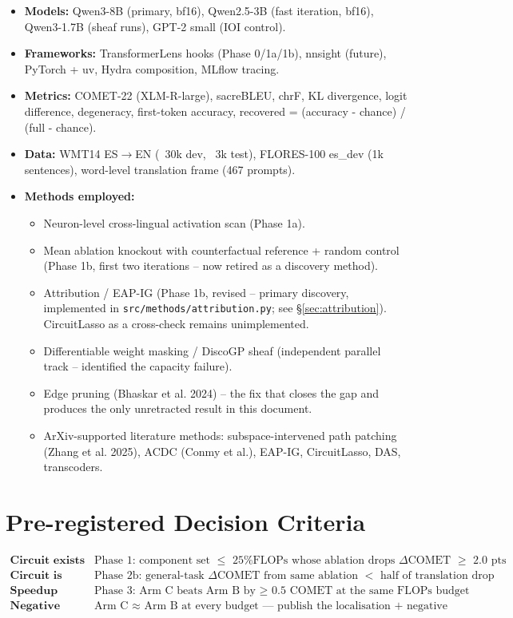 \documentclass[11pt,a4paper]{article}
\begin{document}
\begin{itemize}
\item \textbf{Models:} Qwen3-8B (primary, bf16), Qwen2.5-3B (fast iteration,
  bf16), Qwen3-1.7B (sheaf runs), GPT-2 small (IOI control).
\item \textbf{Frameworks:} TransformerLens hooks (Phase 0/1a/1b), nnsight
  (future), PyTorch + uv, Hydra composition, MLflow tracing.
\item \textbf{Metrics:} COMET-22 (XLM-R-large), sacreBLEU, chrF, KL divergence,
  logit difference, degeneracy, first-token accuracy, recovered = (accuracy -
  chance) / (full - chance).
\item \textbf{Data:} WMT14 ES$\rightarrow$EN (~30k dev, ~3k test), FLORES-100 es\_dev
  (1k sentences), word-level translation frame (467 prompts).
\item \textbf{Methods employed:}
  \begin{itemize}
  \item Neuron-level cross-lingual activation scan (Phase 1a).
  \item Mean ablation knockout with counterfactual reference + random control
    (Phase 1b, first two iterations -- now retired as a discovery method).
  \item Attribution / EAP-IG (Phase 1b, revised -- primary discovery,
    implemented in \texttt{src/methods/attribution.py}; see
    \S\ref{sec:attribution}). CircuitLasso as a cross-check remains
    unimplemented.
  \item Differentiable weight masking / DiscoGP sheaf (independent parallel track
    -- identified the capacity failure).
  \item Edge pruning (Bhaskar et al. 2024) -- the fix that closes the gap and
    produces the only unretracted result in this document.
  \item ArXiv-supported literature methods: subspace-intervened path patching
    (Zhang et al. 2025), ACDC (Conmy et al.), EAP-IG, CircuitLasso, DAS,
    transcoders.
  \end{itemize}
\end{itemize}

\section{Pre-registered Decision Criteria}

\[
\begin{array}{lc}
\textbf{Circuit exists} & \text{Phase 1: component set $\leq$ 25\% FLOPs whose ablation
  drops $\Delta$COMET $\geq$ 2.0 pts}\\
\textbf{Circuit is separable} & \text{Phase 2b: general-task $\Delta$COMET from same ablation
  $<$ half of translation drop} \\
\textbf{Speedup claim} & \text{Phase 3: Arm C beats Arm B by $\geq$ 0.5 COMET at the
  same FLOPs budget} \\
\textbf{Negative} & \text{Arm C $\approx$ Arm B at every budget --- publish
  the localisation + negative efficiency result} \\
\end{array}
\]
\end{document}
